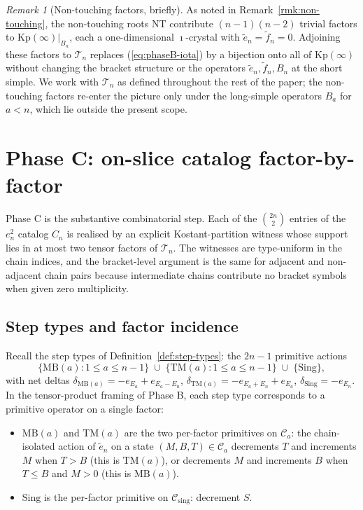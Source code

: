\documentclass[11pt]{article}
\theoremstyle{definition}
\theoremstyle{remark}
\newtheorem{remark}[theorem]{Remark}
\newcommand{\Kp}{\mathrm{Kp}}
\newcommand{\NT}{\mathrm{NT}}
\newcommand{\Sing}{\mathrm{Sing}}
\newcommand{\MB}{\mathrm{MB}}
\newcommand{\TM}{\mathrm{TM}}
\newcommand{\Cmid}{\mathcal{C}}
\newcommand{\Csing}{\mathcal{C}_{\mathrm{sing}}}
\newcommand{\TT}{\mathcal{T}}
\begin{document}
\begin{remark}[Non-touching factors, briefly]\label{rmk:non-touching-phaseB}
As noted in Remark~\ref{rmk:non-touching}, the non-touching roots $\NT$ contribute
$(n-1)(n-2)$ trivial factors to $\Kp(\infty)|_{B_n}$, each a one-dimensional
$\imath$-crystal with $\tilde e_n = \tilde f_n = 0$. Adjoining these factors to
$\TT_n$ replaces (\ref{eq:phaseB-iota}) by a bijection onto all of $\Kp(\infty)$
without changing the bracket structure or the operators $\tilde e_n, \tilde f_n,
B_n$ at the short simple. We work with $\TT_n$ as defined throughout the rest of
the paper; the non-touching factors re-enter the picture only under the
long-simple operators $B_a$ for $a < n$, which lie outside the present scope.
\end{remark}

\section{Phase C: on-slice catalog factor-by-factor}\label{sec:phaseC}

Phase C is the substantive combinatorial step. Each of the $\binom{2n}{2}$ entries
of the $e_n^2$ catalog $C_n$ is realised by an explicit Kostant-partition witness
whose support lies in at most two tensor factors of $\TT_n$. The witnesses are
type-uniform in the chain indices, and the bracket-level argument is the same for
adjacent and non-adjacent chain pairs because intermediate chains contribute no
bracket symbols when given zero multiplicity.

\subsection{Step types and factor incidence}\label{ssec:step-incidence}

Recall the step types of Definition~\ref{def:step-types}: the $2n - 1$ primitive
actions
\[
\{\MB(a) : 1 \leq a \leq n - 1\} \;\cup\; \{\TM(a) : 1 \leq a \leq n - 1\} \;\cup\; \{\Sing\},
\]
with net deltas $\delta_{\MB(a)} = -e_{E_a} + e_{E_a - E_n}$, $\delta_{\TM(a)} =
-e_{E_a + E_n} + e_{E_a}$, $\delta_{\Sing} = -e_{E_n}$. In the tensor-product
framing of Phase B, each step type corresponds to a primitive operator on a single
factor:

\begin{itemize}[leftmargin=2em]
  \item $\MB(a)$ and $\TM(a)$ are the two per-factor primitives on $\Cmid_a$: the
    chain-isolated action of $\tilde e_n$ on a state $(M, B, T) \in \Cmid_a$
    decrements $T$ and increments $M$ when $T > B$ (this is $\TM(a)$), or
    decrements $M$ and increments $B$ when $T \leq B$ and $M > 0$ (this is
    $\MB(a)$).
  \item $\Sing$ is the per-factor primitive on $\Csing$: decrement $S$.
\end{itemize}
\end{document}
